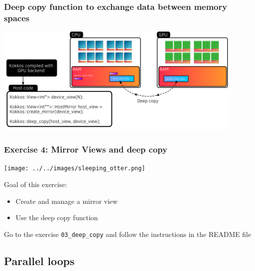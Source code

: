 \documentclass[aspectratio=169]{beamer}
\begin{document}
\begin{frame}[fragile]
    \frametitle{Deep copy function to exchange data between memory spaces}

    \begin{center}
        \includegraphics[width=0.9\textwidth]{../../images/device_host_deep_copy.png}
    \end{center}

\end{frame}


\begin{frame}[fragile]
    \frametitle{Exercise 4: Mirror Views and deep copy} 

    \begin{center}
    \texttt{[image: ../../images/sleeping\_otter.png]}
    \end{center}

    Goal of this exercise:

    \begin{itemize}
        \item Create and manage a mirror view
        \item Use the deep copy function
    \end{itemize}

    \begin{block}{}
        Go to the exercise \texttt{03\_deep\_copy} and follow the instructions in the README file
    \end{block}

\end{frame}


\subsection[Data container]{Parallel loops}
\end{document}
